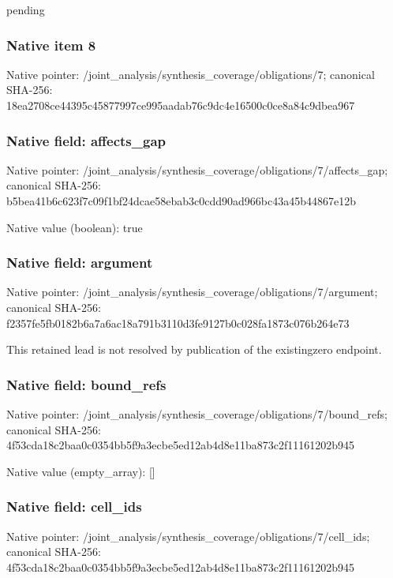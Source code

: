 \documentclass[10pt,a4paper]{article}
\begin{document}
\begingroup\raggedright\sloppy pending\par\endgroup

\subsubsection{Native item 8}
Native pointer: /joint\_\allowbreak{}analysis/synthesis\_\allowbreak{}coverage/obligations/7; canonical SHA-256: 18ea2708ce44395c45877997ce995aadab76c9dc4e16500c0ce8a84c9dbea967

\subsubsection{Native field: affects\_\allowbreak{}gap}
Native pointer: /joint\_\allowbreak{}analysis/synthesis\_\allowbreak{}coverage/obligations/7/affects\_\allowbreak{}gap; canonical SHA-256: b5bea41b6c623f7c09f1bf24dcae58ebab3c0cdd90ad966bc43a45b44867e12b

Native value (boolean): true

\subsubsection{Native field: argument}
Native pointer: /joint\_\allowbreak{}analysis/synthesis\_\allowbreak{}coverage/obligations/7/argument; canonical SHA-256: f2357fe5fb0182b6a7a6ac18a791b3110d3fe9127b0c028fa1873c076b264e73

\begingroup\raggedright\sloppy This retained lead is not resolved by publication of the existingzero endpoint.\par\endgroup

\subsubsection{Native field: bound\_\allowbreak{}refs}
Native pointer: /joint\_\allowbreak{}analysis/synthesis\_\allowbreak{}coverage/obligations/7/bound\_\allowbreak{}refs; canonical SHA-256: 4f53cda18c2baa0c0354bb5f9a3ecbe5ed12ab4d8e11ba873c2f11161202b945

Native value (empty\_\allowbreak{}array): []

\subsubsection{Native field: cell\_\allowbreak{}ids}
Native pointer: /joint\_\allowbreak{}analysis/synthesis\_\allowbreak{}coverage/obligations/7/cell\_\allowbreak{}ids; canonical SHA-256: 4f53cda18c2baa0c0354bb5f9a3ecbe5ed12ab4d8e11ba873c2f11161202b945
\end{document}
